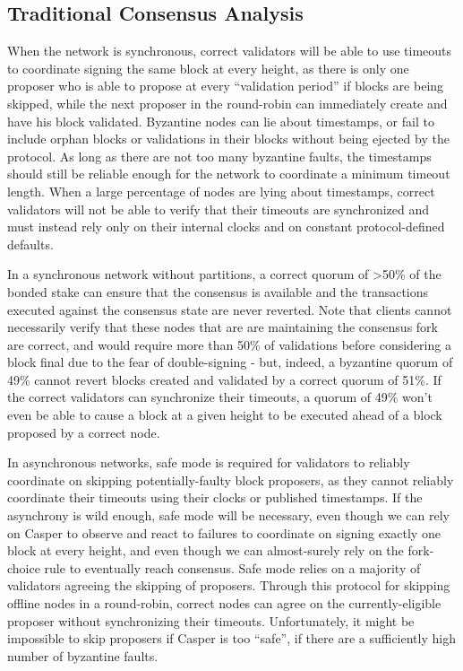 \documentclass[11pt,a4paper]{article}
\begin{document}
\subsection{Traditional Consensus Analysis}

When the network is synchronous, correct validators will be able to use timeouts to coordinate signing the same block at every height, as there is only one proposer who is able to propose at every ``validation period'' if blocks are being skipped, while the next proposer in the round-robin can immediately create and have his block validated. Byzantine nodes can lie about timestamps, or fail to include orphan blocks or validations in their blocks without being ejected by the protocol. As long as there are not too many byzantine faults, the timestamps should still be reliable enough for the network to coordinate a minimum timeout length. When a large percentage of nodes are lying about timestamps, correct validators will not be able to verify that their timeouts are synchronized and must instead rely only on their internal clocks and on constant protocol-defined defaults.

In a synchronous network without partitions, a correct quorum of >50\% of the bonded stake can ensure that the consensus is available and the transactions executed against the consensus state are never reverted. Note that clients cannot necessarily verify that these nodes that are are maintaining the consensus fork are correct, and would require more than 50\% of validations before considering a block final due to the fear of double-signing - but, indeed, a byzantine quorum of 49\% cannot revert blocks created and validated by a correct quorum of 51\%. If the correct validators can synchronize their timeouts, a quorum of 49\% won't even be able to cause a block at a given height to be executed ahead of a block proposed by a correct node.

In asynchronous networks, safe mode is required for validators to reliably coordinate on skipping potentially-faulty block proposers, as they cannot reliably coordinate their timeouts using their clocks or published timestamps. If the asynchrony is wild enough, safe mode will be necessary, even though we can rely on Casper to observe and react to failures to coordinate on signing exactly one block at every height, and even though we can almost-surely rely on the fork-choice rule to eventually reach consensus. Safe mode relies on a majority of validators agreeing the skipping of proposers. Through this protocol for skipping offline nodes in a round-robin, correct nodes can agree on the currently-eligible proposer without synchronizing their timeouts. Unfortunately, it might be impossible to skip proposers if Casper is too ``safe'', if there are a sufficiently high number of byzantine faults. 
\end{document}
